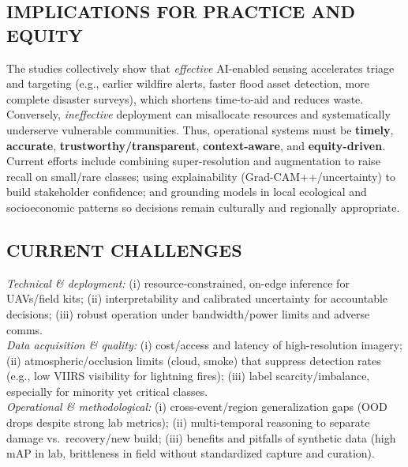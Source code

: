 \documentclass[conference,a4paper]{IEEEtran}
\begin{document}
\subsection{IMPLICATIONS FOR PRACTICE AND EQUITY}
The studies collectively show that \emph{effective} AI-enabled sensing accelerates triage and targeting (e.g., earlier wildfire alerts, faster flood asset detection, more complete disaster surveys), which shortens time-to-aid and reduces waste. Conversely, \emph{ineffective} deployment can misallocate resources and systematically underserve vulnerable communities. Thus, operational systems must be \textbf{timely}, \textbf{accurate}, \textbf{trustworthy/transparent}, \textbf{context-aware}, and \textbf{equity-driven}. Current efforts include combining super-resolution and augmentation to raise recall on small/rare classes; using explainability (Grad-CAM++/uncertainty) to build stakeholder confidence; and grounding models in local ecological and socioeconomic patterns so decisions remain culturally and regionally appropriate.

\subsection{CURRENT CHALLENGES}
\textit{Technical \& deployment:} (i) resource-constrained, on-edge inference for UAVs/field kits; (ii) interpretability and calibrated uncertainty for accountable decisions; (iii) robust operation under bandwidth/power limits and adverse comms.\\
\textit{Data acquisition \& quality:} (i) cost/access and latency of high-resolution imagery; (ii) atmospheric/occlusion limits (cloud, smoke) that suppress detection rates (e.g., low VIIRS visibility for lightning fires); (iii) label scarcity/imbalance, especially for minority yet critical classes.\\
\textit{Operational \& methodological:} (i) cross-event/region generalization gaps (OOD drops despite strong lab metrics); (ii) multi-temporal reasoning to separate damage vs.\ recovery/new build; (iii) benefits and pitfalls of synthetic data (high mAP in lab, brittleness in field without standardized capture and curation).
\end{document}
